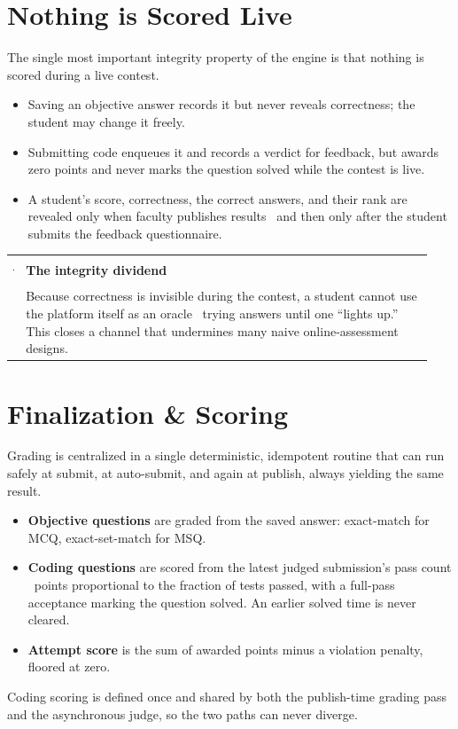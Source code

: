 \documentclass[12pt,a4paper,oneside]{report}
\makeatletter
\newenvironment{callout}[1]{\par\vspace{4pt}\noindent
  \begin{tabular}{@{}p{0.014\linewidth}@{\hspace{0.6em}}p{0.93\linewidth}@{}}
  \textcolor{boxframe}{\rule{2pt}{\baselineskip}} & \textbf{\textcolor{tcetblue}{#1}}\\[2pt] & }{\end{tabular}\par\vspace{6pt}}
\makeatother
\begin{document}
\section{Nothing is Scored Live}
The single most important integrity property of the engine is that nothing is
scored during a live contest.
\begin{itemize}[leftmargin=1.5em]
  \item Saving an objective answer records it but never reveals correctness; the
        student may change it freely.
  \item Submitting code enqueues it and records a verdict for feedback, but
        awards zero points and never marks the question solved while the contest
        is live.
  \item A student's score, correctness, the correct answers, and their rank are
        revealed only when faculty publishes results \textemdash\ and then only
        after the student submits the feedback questionnaire.
\end{itemize}

\begin{callout}{The integrity dividend}
Because correctness is invisible during the contest, a student cannot use the
platform itself as an oracle \textemdash\ trying answers until one ``lights up.''
This closes a channel that undermines many naive online-assessment designs.
\end{callout}

\section{Finalization \& Scoring}
Grading is centralized in a single deterministic, idempotent routine that can run
safely at submit, at auto-submit, and again at publish, always yielding the same
result.
\begin{itemize}[leftmargin=1.5em]
  \item \textbf{Objective questions} are graded from the saved answer:
        exact-match for MCQ, exact-set-match for MSQ.
  \item \textbf{Coding questions} are scored from the latest judged submission's
        pass count \textemdash\ points proportional to the fraction of tests
        passed, with a full-pass acceptance marking the question solved. An
        earlier solved time is never cleared.
  \item \textbf{Attempt score} is the sum of awarded points minus a violation
        penalty, floored at zero.
\end{itemize}
Coding scoring is defined once and shared by both the publish-time grading pass
and the asynchronous judge, so the two paths can never diverge.
\end{document}
